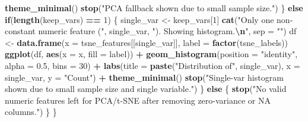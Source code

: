 \documentclass[
]{article}
\newenvironment{Shaded}{\begin{snugshade}}{\end{snugshade}}
\newcommand{\AttributeTok}[1]{\textcolor[rgb]{0.13,0.29,0.53}{#1}}
\newcommand{\ControlFlowTok}[1]{\textcolor[rgb]{0.13,0.29,0.53}{\textbf{#1}}}
\newcommand{\DecValTok}[1]{\textcolor[rgb]{0.00,0.00,0.81}{#1}}
\newcommand{\FloatTok}[1]{\textcolor[rgb]{0.00,0.00,0.81}{#1}}
\newcommand{\FunctionTok}[1]{\textcolor[rgb]{0.13,0.29,0.53}{\textbf{#1}}}
\newcommand{\NormalTok}[1]{#1}
\newcommand{\OtherTok}[1]{\textcolor[rgb]{0.56,0.35,0.01}{#1}}
\newcommand{\SpecialCharTok}[1]{\textcolor[rgb]{0.81,0.36,0.00}{\textbf{#1}}}
\newcommand{\StringTok}[1]{\textcolor[rgb]{0.31,0.60,0.02}{#1}}
\begin{document}
\begin{Shaded}
\begin{Highlighting}[]
      \FunctionTok{theme\_minimal}\NormalTok{()}
    \FunctionTok{stop}\NormalTok{(}\StringTok{"PCA fallback shown due to small sample size."}\NormalTok{)}
\NormalTok{  \} }\ControlFlowTok{else} \ControlFlowTok{if}\NormalTok{(}\FunctionTok{length}\NormalTok{(keep\_vars) }\SpecialCharTok{==} \DecValTok{1}\NormalTok{) \{}
\NormalTok{    single\_var }\OtherTok{\textless{}{-}}\NormalTok{ keep\_vars[}\DecValTok{1}\NormalTok{]}
    \FunctionTok{cat}\NormalTok{(}\StringTok{"Only one non{-}constant numeric feature ("}\NormalTok{, single\_var, }\StringTok{"). Showing histogram.}\SpecialCharTok{\textbackslash{}n}\StringTok{"}\NormalTok{, }\AttributeTok{sep =} \StringTok{""}\NormalTok{)}
\NormalTok{    df }\OtherTok{\textless{}{-}} \FunctionTok{data.frame}\NormalTok{(}\AttributeTok{x =}\NormalTok{ tsne\_features[[single\_var]], }\AttributeTok{label =} \FunctionTok{factor}\NormalTok{(tsne\_labels))}
    \FunctionTok{ggplot}\NormalTok{(df, }\FunctionTok{aes}\NormalTok{(}\AttributeTok{x =}\NormalTok{ x, }\AttributeTok{fill =}\NormalTok{ label)) }\SpecialCharTok{+}
      \FunctionTok{geom\_histogram}\NormalTok{(}\AttributeTok{position =} \StringTok{"identity"}\NormalTok{, }\AttributeTok{alpha =} \FloatTok{0.5}\NormalTok{, }\AttributeTok{bins =} \DecValTok{30}\NormalTok{) }\SpecialCharTok{+}
      \FunctionTok{labs}\NormalTok{(}\AttributeTok{title =} \FunctionTok{paste}\NormalTok{(}\StringTok{"Distribution of"}\NormalTok{, single\_var), }\AttributeTok{x =}\NormalTok{ single\_var, }\AttributeTok{y =} \StringTok{"Count"}\NormalTok{) }\SpecialCharTok{+}
      \FunctionTok{theme\_minimal}\NormalTok{()}
    \FunctionTok{stop}\NormalTok{(}\StringTok{"Single{-}var histogram shown due to small sample size and single variable."}\NormalTok{)}
\NormalTok{  \} }\ControlFlowTok{else}\NormalTok{ \{}
    \FunctionTok{stop}\NormalTok{(}\StringTok{"No valid numeric features left for PCA/t{-}SNE after removing zero{-}variance or NA columns."}\NormalTok{)}
\NormalTok{  \}}
\NormalTok{\}}


\end{Highlighting}
\end{Shaded}
\end{document}
